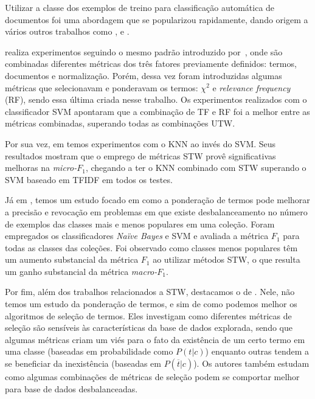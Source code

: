 Utilizar a classe dos exemplos de treino para classificação automática de documentos foi uma abordagem que se popularizou rapidamente, dando origem a vários outros trabalhos como \cite{Lan05}, \cite{Batal09} e \cite{Liu09}.

\cite{Lan05} realiza experimentos seguindo o mesmo padrão introduzido por~\cite{Salton88}, onde são combinadas diferentes métricas dos três fatores previamente definidos: termos, documentos e normalização. 
Porém, dessa vez foram introduzidas algumas métricas que selecionavam e ponderavam os termos: $\chi^2$ e \textit{relevance frequency} (\textsc{RF}), sendo essa última criada nesse trabalho. Os experimentos realizados com o classificador \textsc{SVM} apontaram que a combinação de \textsc{TF} e \textsc{RF} foi a melhor entre as métricas combinadas, superando todas as combinações \textsc{UTW}. 

Por sua vez, em \cite{Batal09} temos experimentos com o \textsc{KNN} ao invés do \textsc{SVM}. Seus resultados mostram que o emprego de métricas \textsc{STW} provê significativas melhoras na \textit{micro-$F_1$}, chegando a ter o \textsc{KNN} combinado com \textsc{STW} superando o \textsc{SVM} baseado em \textsc{TFIDF} em todos os testes.

Já em \cite{Liu09}, temos um estudo focado em como 
 a ponderação de termos pode melhorar a precisão e revocação em problemas em que existe desbalanceamento no número de exemplos das classes mais e menos populares em uma coleção. Foram empregados os classificadores \textit{Naïve Bayes} e \textsc{SVM} e avaliada a métrica $F_1$ para todas as classes das coleções. Foi observado como classes menos populares têm um aumento substancial da métrica $F_1$ ao utilizar métodos \textsc{STW}, o que resulta um ganho substancial da métrica \textit{macro-$F_1$}.

Por fim, além dos trabalhos relacionados a \textsc{STW}, destacamos o de \cite{Tang05}. 
Nele, não temos um estudo da ponderação de termos, e sim de como podemos melhor os algoritmos de seleção de termos.
Eles investigam como diferentes métricas de seleção são sensíveis às características da base de dados explorada, sendo que algumas métricas criam um viés para o fato da existência de um certo termo em uma classe (baseadas em probabilidade como $P(t|c)$) enquanto outras tendem a se beneficiar da inexistência (baseadas em $P(\overline{t}|c)$). Os autores também estudam como algumas combinações de métricas de seleção podem se comportar melhor para base de dados desbalanceadas. 

